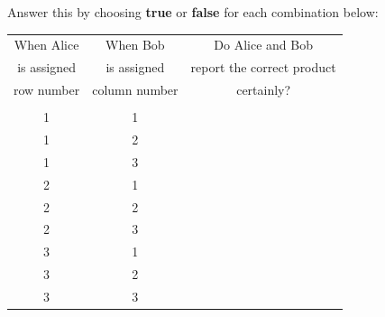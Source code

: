 \documentclass[12pt]{article}
\begin{document}
\begin{enumerate}
\begin{enumerate}[label=\theenumi.\arabic*]
    Answer this by choosing \textbf{true} or \textbf{false} for each combination below:
    {%
    \def\B#1{\fbox{\hbox to 3em{\vrule width 0pt height 2em\hss #1\hss}}}
    \begin{center}
        \begin{tabular}{ccc}
                 When Alice & When Bob &  Do Alice and Bob \\
                is assigned  & is assigned & report the correct product \\
                 row number & column number& certainly? \\ \hline \\
                 1 & 1 & \TF{} \\[1.3em]
                 1 & 2 & \TF{} \\[1.3em]
                 1 & 3 & \TF{} \\[1.3em]
                 2 & 1 & \TF{} \\[1.3em]
                 2 & 2 & \TF{} \\[1.3em]
                 2 & 3 & \TF{} \\[1.3em]
                 3 & 1 & \TF{} \\[1.3em]
                 3 & 2 & \TF{} \\[1.3em]
                 3 & 3 & \TF{}


\end{tabular}
\end{center}}
\end{enumerate}
\end{enumerate}
\end{document}
